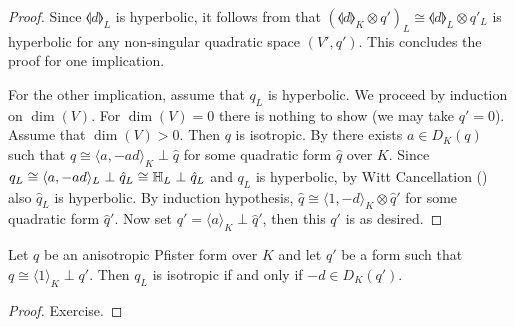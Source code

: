 \documentclass[12pt, leqno, british]{amsart}
\begin{document}
\begin{proof}
Since $\llangle d \rrangle_L$ is hyperbolic, it follows from  that $(\llangle d \rrangle_K \otimes q')_L \cong \llangle d \rrangle_L \otimes q'_L$ is hyperbolic for any non-singular quadratic space $(V', q')$.
This concludes the proof for one implication.

For the other implication, assume that $q_L$ is hyperbolic.
We proceed by induction on $\dim(V)$.
For $\dim(V) = 0$ there is nothing to show (we may take $q' = 0$).
Assume that $\dim(V) > 0$.
Then $q$ is isotropic.
By  there exists $a \in D_K(q)$ such that $q \cong \langle a, -ad \rangle_K \perp \hat{q}$ for some quadratic form $\hat{q}$ over $K$.
Since $q_L \cong \langle a, -ad \rangle_L \perp \hat{q}_L \cong \mathbb{H}_L \perp \hat{q}_L$ and $q_L$ is hyperbolic, by Witt Cancellation () also $\hat{q}_L$ is hyperbolic.
By induction hypothesis, $\hat{q} \cong \langle 1, -d \rangle_K \otimes \hat{q}'$ for some quadratic form $\hat{q}'$.
Now set $q' = \langle a \rangle_K \perp \hat{q}'$, then this $q'$ is as desired.
\end{proof}
\begin{cor}\label{C:Pfister-isotropic-quadratic}
Let $q$ be an anisotropic Pfister form over $K$ and let $q'$ be a form such that $q \cong \langle 1 \rangle_K \perp q'$.
Then $q_{L}$ is isotropic if and only if $-d \in D_K(q')$.
\end{cor}
\begin{proof}
Exercise.
\end{proof}
\end{document}
